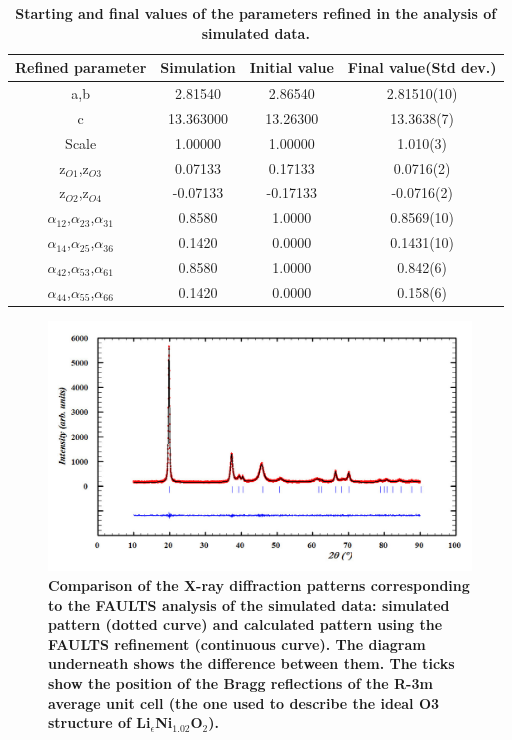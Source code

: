 \begin{table}
\begin{center}
\begin{tabular}{|c|c|c|c|}
\hline
Refined parameter & Simulation & Initial value & Final value(Std dev.)\\

\hline
a,b & 2.81540 & 2.86540 & 2.81510(10)\\
\hline
c & 13.363000 & 13.26300 & 13.3638(7)\\
\hline
Scale & 1.00000 & 1.00000 & 1.010(3)\\
\hline
z$_{O1}$,z$_{O3}$ & 0.07133	&0.17133&	0.0716(2)\\
\hline
z$_{O2}$,z$_{O4}$ & -0.07133	&-0.17133& -0.0716(2)\\
\hline
$\alpha_{12}$,$\alpha_{23}$,$\alpha_{31}$ & 0.8580&	1.0000	&0.8569(10)\\
\hline
$\alpha_{14}$,$\alpha_{25}$,$\alpha_{36}$ & 0.1420&	0.0000	&0.1431(10)\\
\hline
$\alpha_{42}$,$\alpha_{53}$,$\alpha_{61}$ & 0.8580&	1.0000	&0.842(6)\\
\hline
$\alpha_{44}$,$\alpha_{55}$,$\alpha_{66}$ & 0.1420&	0.0000	&0.158(6)\\
\hline


\end{tabular}
\caption{\textbf{Starting and final values of the parameters refined in the analysis of simulated data.}}
\label{taulasim}
\end{center}
\end{table}


\begin{figure}
\begin{center}
\includegraphics [width=6 in]{pattern.jpg}
\caption{\bf Comparison of the X-ray diffraction patterns corresponding to the FAULTS analysis of the simulated data: simulated pattern (dotted curve) and calculated pattern using the FAULTS refinement (continuous curve). The diagram underneath shows the difference between them. The ticks show the position of the Bragg reflections of the R-3m average unit cell (the one used to describe the ideal O3 structure of Li$_{\epsilon}$Ni$_{1.02}$O$_{2}$).  }
\label{sim}
\end{center}
\end{figure}

